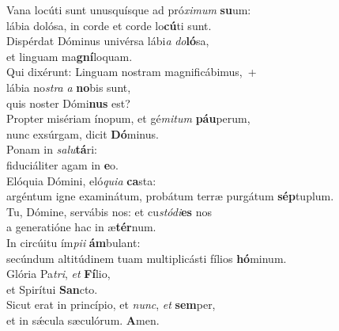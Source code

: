 \evenverse Vana locúti sunt unusquísque ad pró\textit{xi}\textit{mum} \textbf{su}um:~\*\\
\evenverse lábia dolósa, in corde et corde lo\textbf{cú}ti sunt.\\
\oddverse Dispérdat Dóminus univérsa lábi\textit{a} \textit{do}\textbf{ló}sa,~\*\\
\oddverse et linguam ma\textbf{gní}loquam.\\
\evenverse Qui dixérunt: Linguam nostram magnificábimus,~+\\
\evenverse  lábia no\textit{stra} \textit{a} \textbf{no}bis sunt,~\*\\
\evenverse quis noster Dómi\textbf{nus} est?\\
\oddverse Propter misériam ínopum, et gé\textit{mi}\textit{tum} \textbf{páu}perum,~\*\\
\oddverse nunc exsúrgam, dicit \textbf{Dó}minus.\\
\evenverse Ponam in \textit{sa}\textit{lu}\textbf{tá}ri:~\*\\
\evenverse fiduciáliter agam in \textbf{e}o.\\
\oddverse Elóquia Dómini, eló\textit{qui}\textit{a} \textbf{ca}sta:~\*\\
\oddverse argéntum igne examinátum, probátum terræ purgátum \textbf{sép}tuplum.\\
\evenverse Tu, Dómine, servábis nos: et cu\textit{stó}\textit{di}\textbf{es} nos~\*\\
\evenverse a generatióne hac in æ\textbf{tér}num.\\
\oddverse In circúitu ím\textit{pi}\textit{i} \textbf{ám}bulant:~\*\\
\oddverse secúndum altitúdinem tuam multiplicásti fílios \textbf{hó}minum.\\
\evenverse Glória Pa\textit{tri}, \textit{et} \textbf{Fí}lio,~\*\\
\evenverse et Spirítui \textbf{San}cto.\\
\oddverse Sicut erat in princípio, et \textit{nunc}, \textit{et} \textbf{sem}per,~\*\\
\oddverse et in sǽcula sæculórum. \textbf{A}men.\\
